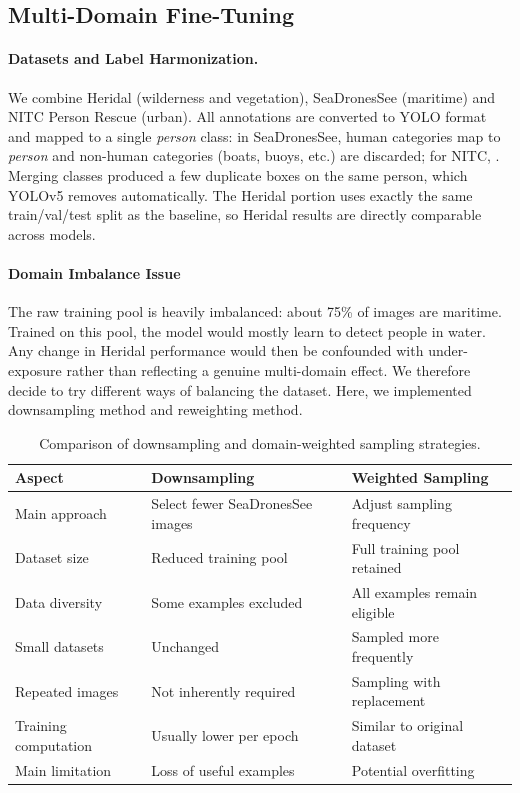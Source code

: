 \documentclass{article}
\begin{document}
\subsection{Multi-Domain Fine-Tuning}
 
\paragraph{Datasets and Label Harmonization.} We combine Heridal (wilderness and vegetation), SeaDronesSee (maritime) and NITC Person Rescue (urban). All annotations are converted to YOLO format and mapped to a single \emph{person} class: in SeaDronesSee, human categories  map to \emph{person} and non-human categories (boats, buoys, etc.) are discarded; for NITC, . Merging classes produced a few duplicate boxes on the same person, which YOLOv5 removes automatically. The Heridal portion uses exactly the same train/val/test split as the baseline, so Heridal results are directly comparable across models.
 
\paragraph{Domain Imbalance Issue} The raw training pool is heavily imbalanced: about 75\% of images are maritime. Trained on this pool, the model would mostly learn to detect people in water. Any change in Heridal performance would then be confounded with under-exposure rather than reflecting a genuine multi-domain effect. 
We therefore decide to try different ways of balancing the dataset. Here, we implemented downsampling method and reweighting method.

\begin{table}[h]
    \centering
    \caption{Comparison of downsampling and domain-weighted sampling strategies.}
    \label{tab:comparison}
    \begin{tabular}{lll}
        \toprule
        Aspect & Downsampling & Weighted Sampling \\
        \midrule
        Main approach & Select fewer SeaDronesSee images & Adjust sampling frequency \\
        Dataset size & Reduced training pool & Full training pool retained \\
        Data diversity & Some examples excluded & All examples remain eligible \\
        Small datasets & Unchanged & Sampled more frequently \\
        Repeated images & Not inherently required & Sampling with replacement \\
        Training computation & Usually lower per epoch & Similar to original dataset \\
        Main limitation & Loss of useful examples & Potential overfitting \\
        \bottomrule
    \end{tabular}
\end{table}
\end{document}
